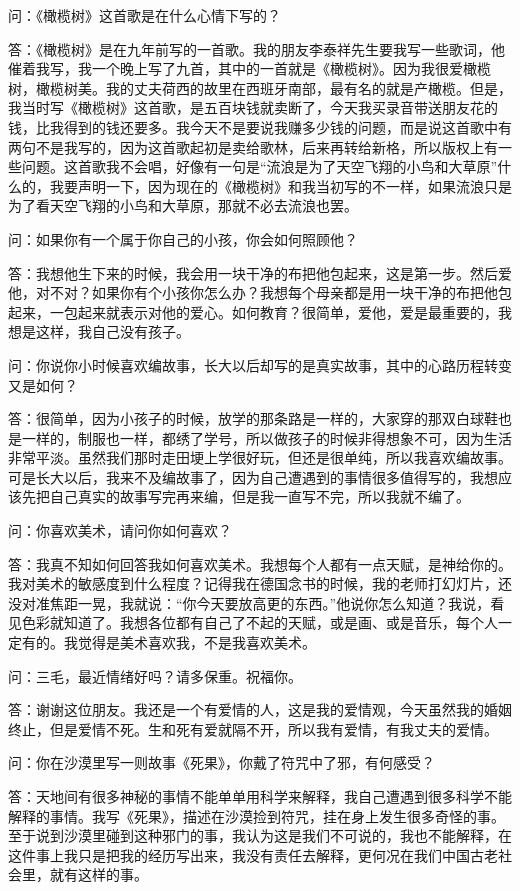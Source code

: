 \par 问：《橄榄树》这首歌是在什么心情下写的？
\par 答：《橄榄树》是在九年前写的一首歌。我的朋友李泰祥先生要我写一些歌词，他催着我写，我一个晚上写了九首，其中的一首就是《橄榄树》。因为我很爱橄榄树，橄榄树美。我的丈夫荷西的故里在西班牙南部，最有名的就是产橄榄。但是，我当时写《橄榄树》这首歌，是五百块钱就卖断了，今天我买录音带送朋友花的钱，比我得到的钱还要多。我今天不是要说我赚多少钱的问题，而是说这首歌中有两句不是我写的，因为这首歌起初是卖给歌林，后来再转给新格，所以版权上有一些问题。这首歌我不会唱，好像有一句是“流浪是为了天空飞翔的小鸟和大草原”什么的，我要声明一下，因为现在的《橄榄树》和我当初写的不一样，如果流浪只是为了看天空飞翔的小鸟和大草原，那就不必去流浪也罢。
\par 问：如果你有一个属于你自己的小孩，你会如何照顾他？
\par 答：我想他生下来的时候，我会用一块干净的布把他包起来，这是第一步。然后爱他，对不对？如果你有个小孩你怎么办？我想每个母亲都是用一块干净的布把他包起来，一包起来就表示对他的爱心。如何教育？很简单，爱他，爱是最重要的，我想是这样，我自己没有孩子。
\par 问：你说你小时候喜欢编故事，长大以后却写的是真实故事，其中的心路历程转变又是如何？
\par 答：很简单，因为小孩子的时候，放学的那条路是一样的，大家穿的那双白球鞋也是一样的，制服也一样，都绣了学号，所以做孩子的时候非得想象不可，因为生活非常平淡。虽然我们那时走田埂上学很好玩，但还是很单纯，所以我喜欢编故事。可是长大以后，我来不及编故事了，因为自己遭遇到的事情很多值得写的，我想应该先把自己真实的故事写完再来编，但是我一直写不完，所以我就不编了。
\par 问：你喜欢美术，请问你如何喜欢？
\par 答：我真不知如何回答我如何喜欢美术。我想每个人都有一点天赋，是神给你的。我对美术的敏感度到什么程度？记得我在德国念书的时候，我的老师打幻灯片，还没对准焦距一晃，我就说：“你今天要放高更的东西。”他说你怎么知道？我说，看见色彩就知道了。我想各位都有自己了不起的天赋，或是画、或是音乐，每个人一定有的。我觉得是美术喜欢我，不是我喜欢美术。
\par 问：三毛，最近情绪好吗？请多保重。祝福你。
\par 答：谢谢这位朋友。我还是一个有爱情的人，这是我的爱情观，今天虽然我的婚姻终止，但是爱情不死。生和死有爱就隔不开，所以我有爱情，有我丈夫的爱情。
\par 问：你在沙漠里写一则故事《死果》，你戴了符咒中了邪，有何感受？
\par 答：天地间有很多神秘的事情不能单单用科学来解释，我自己遭遇到很多科学不能解释的事情。我写《死果》，描述在沙漠捡到符咒，挂在身上发生很多奇怪的事。至于说到沙漠里碰到这种邪门的事，我认为这是我们不可说的，我也不能解释，在这件事上我只是把我的经历写出来，我没有责任去解释，更何况在我们中国古老社会里，就有这样的事。

